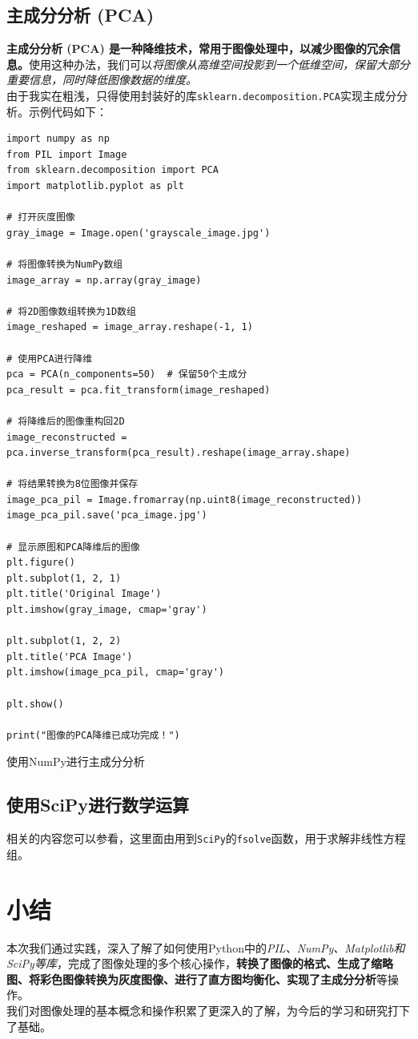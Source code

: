 \subsection{主成分分析 (PCA)}

\textbf{主成分分析 (PCA) 是一种降维技术，常用于图像处理中，以减少图像的冗余信息。}使用这种办法，我们可以\textit{将图像从高维空间投影到一个低维空间，保留大部分重要信息，同时降低图像数据的维度。}\\

由于我实在粗浅，只得使用封装好的库\texttt{sklearn.decomposition.PCA}实现主成分分析。示例代码如下：

\begin{longlisting}
    \begin{verbatim}
import numpy as np
from PIL import Image
from sklearn.decomposition import PCA
import matplotlib.pyplot as plt

# 打开灰度图像
gray_image = Image.open('grayscale_image.jpg')

# 将图像转换为NumPy数组
image_array = np.array(gray_image)

# 将2D图像数组转换为1D数组
image_reshaped = image_array.reshape(-1, 1)

# 使用PCA进行降维
pca = PCA(n_components=50)  # 保留50个主成分
pca_result = pca.fit_transform(image_reshaped)

# 将降维后的图像重构回2D
image_reconstructed = pca.inverse_transform(pca_result).reshape(image_array.shape)

# 将结果转换为8位图像并保存
image_pca_pil = Image.fromarray(np.uint8(image_reconstructed))
image_pca_pil.save('pca_image.jpg')

# 显示原图和PCA降维后的图像
plt.figure()
plt.subplot(1, 2, 1)
plt.title('Original Image')
plt.imshow(gray_image, cmap='gray')

plt.subplot(1, 2, 2)
plt.title('PCA Image')
plt.imshow(image_pca_pil, cmap='gray')

plt.show()

print("图像的PCA降维已成功完成！")
    \end{verbatim}
    \caption{使用NumPy进行主成分分析}
    \label{listing:nppca}
\end{longlisting}

\subsection{使用SciPy进行数学运算}

相关的内容您可以参看，这里面由用到\texttt{SciPy}的\texttt{fsolve}函数，用于求解非线性方程组。\\

\section{小结}

本次我们通过实践，深入了解了如何使用Python中的\emph{PIL、NumPy、Matplotlib和SciPy等库}，完成了图像处理的多个核心操作，\textbf{转换了图像的格式、生成了缩略图、将彩色图像转换为灰度图像、进行了直方图均衡化、实现了主成分分析}等操作。\\

我们对图像处理的基本概念和操作积累了更深入的了解，为今后的学习和研究打下了基础。
